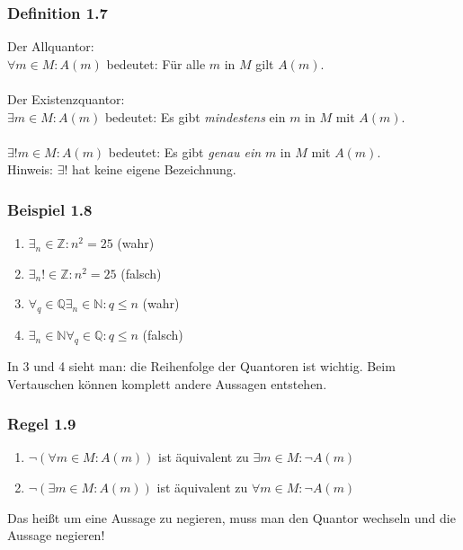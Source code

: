\documentclass{article}
\begin{document}
\subsubsection*{Definition 1.7}
Der Allquantor: \\
$\forall m \in M: A(m)$ bedeutet: Für alle $m$ in $M$ gilt $A(m)$. \\
\\
Der Existenzquantor: \\
$\exists m \in M: A(m)$ bedeutet: Es gibt \textit{mindestens} ein $m$ in $M$ mit $A(m)$. \\
\\
$\exists! m \in M: A(m)$ bedeutet: Es gibt \textit{genau ein} $m$ in $M$ mit $A(m)$. \\
Hinweis: $\exists!$ hat keine eigene Bezeichnung. \\

\subsubsection*{Beispiel 1.8}
\begin{enumerate}
    \item $\exists_n \in \mathbb{Z}: n^2 = 25$ (wahr)
    \item $\exists_n! \in \mathbb{Z}: n^2 = 25$ (falsch)
    \item $\forall_q \in \mathbb{Q} \exists_n \in \mathbb{N}: q \leq n$ (wahr)
    \item $\exists_n \in \mathbb{N} \forall_q \in \mathbb{Q}: q \leq n$ (falsch)
\end{enumerate}

In 3 und 4 sieht man: die Reihenfolge der Quantoren ist wichtig. Beim Vertauschen können komplett andere Aussagen entstehen.

\subsubsection*{Regel 1.9}
\begin{enumerate}
    \item $\neg (\forall m \in M: A(m))$ ist äquivalent zu $\exists m \in M: \neg A(m)$
    \item $\neg (\exists m \in M: A(m))$ ist äquivalent zu $\forall m \in M: \neg A(m)$
\end{enumerate}

Das heißt um eine Aussage zu negieren, muss man den Quantor wechseln und die Aussage negieren! 
\end{document}

